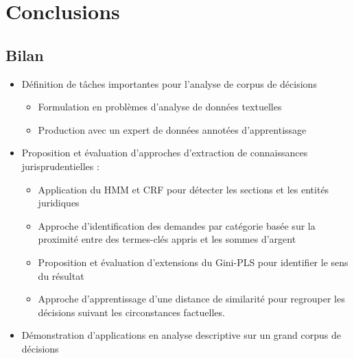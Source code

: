 \section{Conclusions}
\subsection{Bilan}
\begin{frame}[c]{\mysubsectiontitle}	
	\begin{itemize} \small
		\item Définition de tâches importantes pour l'analyse de corpus de décisions 
		\begin{itemize} \scriptsize
			\item Formulation en problèmes d'analyse de données textuelles
			\item Production avec un expert de données annotées d'apprentissage 
		\end{itemize}
		\item Proposition et évaluation d'approches d'extraction de connaissances jurisprudentielles :
		\begin{itemize} \scriptsize
			\item Application du HMM  et CRF pour détecter les sections et les entités juridiques
			\item Approche d'identification des demandes par catégorie basée sur la proximité entre des termes-clés appris et les sommes d'argent		
			\item Proposition et évaluation  d'extensions du Gini-PLS pour identifier le sens du résultat
			\item Approche d'apprentissage d'une distance de similarité pour regrouper les décisions suivant les circonstances factuelles.	
		\end{itemize}
	   \item Démonstration d'applications en analyse descriptive sur un grand corpus de décisions	   
\end{itemize}
\end{frame}

